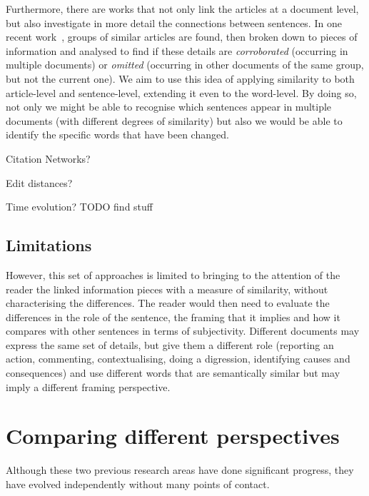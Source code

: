 Furthermore, there are works that not only link the articles at a document level, but also investigate in more detail the connections between sentences.
In one recent work~\cite{bountouridis2018explaining}, groups of similar articles are found, then broken down to pieces of information and analysed to find if these details are \emph{corroborated} (occurring in multiple documents) or \emph{omitted} (occurring in other documents of the same group, but not the current one). 
We aim to use this idea of applying similarity to both article-level and sentence-level, extending it even to the word-level. By doing so,
not only we might be able to recognise which sentences appear in multiple documents (with different degrees of similarity) but also we would be able to identify the specific words that have been changed.




Citation Networks?

Edit distances?

Time evolution? TODO find stuff

\subsection{Limitations}
\label{ssec:lit_relationships_limitations}

However, this set of approaches is limited to bringing to the attention of the reader the linked information pieces with a measure of similarity, without characterising the differences. The reader would then need to evaluate the differences in the role of the sentence, the framing that it implies and how it compares with other sentences in terms of subjectivity.
Different documents may express the same set of details, but give them a different role (reporting an action, commenting, contextualising, doing a digression, identifying causes and consequences) and use different words that are semantically similar but may imply a different framing perspective.






\section{Comparing different perspectives}
\label{sec:lit_gap}
Although these two previous research areas have done significant progress, they have evolved independently without many points of contact.

